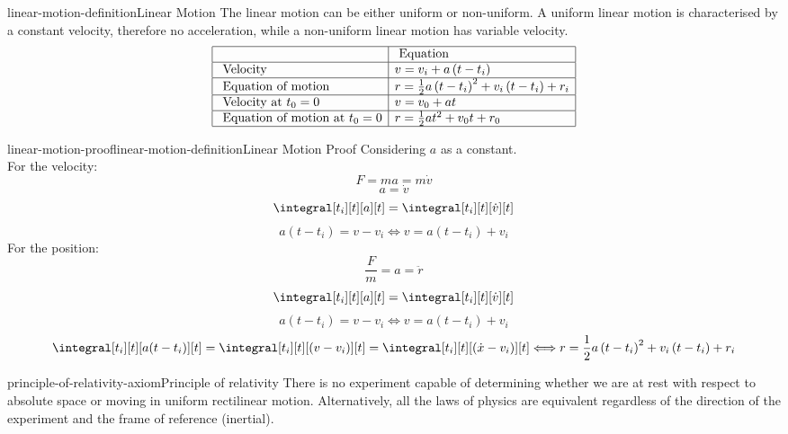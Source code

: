 \documentclass[preview]{standalone}
\begin{document}
\begin{snippetproposition}{linear-motion-definition}{Linear Motion}
    The linear motion can be either uniform or non-uniform. A uniform linear motion is characterised by a constant velocity, therefore no acceleration, while a non-uniform linear motion has variable velocity. \\
    $$ \begin{array}{|l|l|}
        \hline \text {  } & \text { Equation } \\
        \hline \text { Velocity } & v=v_i+a\left(t-t_i\right) \\
        \hline \text { Equation of motion } & r=\frac{1}{2} a\left(t-t_i\right)^2+v_i\left(t-t_i\right)+r_i \\
        \hline \text { Velocity at } t_0=0 & v=v_0+a t \\
        \hline \text { Equation of motion at } t_0=0 & r=\frac{1}{2} a t^2+v_0 t+r_0 \\
        \hline
    \end{array} $$
\end{snippetproposition}

\begin{snippetproof}{linear-motion-proof}{linear-motion-definition}{Linear Motion Proof}
    Considering $a$ as a constant. \\
    For the velocity:
    $$ F = ma = m\dot{v} $$
    $$ a = \dot{v} $$
    $$ \integral[t_i][t][a][t] = \integral[t_i][t][\dot{v}][t] $$
    $$ a(t - t_i) = v - v_i \Longleftrightarrow v = a(t - t_i) + v_i $$
    For the position:
    $$ \frac{F}{m} = a = \ddot{r} $$
    $$ \integral[t_i][t][a][t] = \integral[t_i][t][\dot{v}][t] $$
    $$ a(t - t_i) = v - v_i \Longleftrightarrow v = a(t - t_i) + v_i $$ 
    $$ \integral[t_i][t][a(t - t_i)][t] = \integral[t_i][t][\left( v - v_i \right)][t] = \integral[t_i][t][\left( \dot{x} - v_i \right)][t] \Longleftrightarrow r=\frac{1}{2} a\left(t-t_i\right)^2+v_i\left(t-t_i\right)+r_i $$
\end{snippetproof}

\begin{snippetaxiom}{principle-of-relativity-axiom}{Principle of relativity}
    There is no experiment capable of determining whether we are at rest with respect to
    absolute space or moving in uniform rectilinear motion.
    Alternatively, all the laws of physics are equivalent regardless of the direction of the experiment
    and the frame of reference (inertial).
\end{snippetaxiom}
\end{document}

